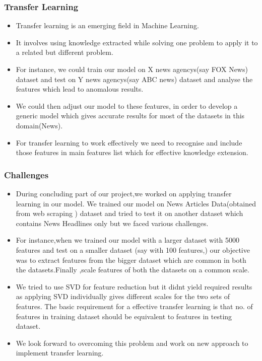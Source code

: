 \documentclass{beamer}
\newcommand\tab[1][1cm]{\hspace*{#1}}
\begin{document}
\begin{frame}
\frametitle{\tab \tab \tab \tab \huge Transfer Learning}
\begin{itemize}
\item Transfer learning is an emerging field in Machine Learning.
\item It involves using knowledge extracted while solving one problem to apply it to a related but different problem.
\item For instance, we could train our model on X news agency\textquotesingle s(say FOX News) dataset and test on Y news agency\textquotesingle s(say ABC news) dataset and analyse the features which lead to anomalous results.
\item We could then adjust our model to these features, in order to develop a generic model which gives accurate results for most of the datasets in this domain(News).
\item For transfer learning to work effectively we need to recognise and include those features in main features list which for effective knowledge extension.
\end{itemize}
\end {frame}

\begin{frame}
\frametitle{\tab \tab \tab \quad \quad \quad \huge Challenges}
\begin{itemize}
\item During concluding part of our project,we worked on applying transfer learning in our model. We trained our model on News Articles Data(obtained from web scraping ) dataset and tried to test it on another dataset which contains News Headlines only but we faced various challenges. \\
\item For instance,when we trained our model with a larger dataset with 5000 features and test on a smaller dataset (say with 100 features,) our objective was to extract features from the bigger dataset which are common in both the datasets.Finally ,scale features of both the datasets on a common scale. \\
\item We tried to use SVD for feature reduction but it didn\textquotesingle t yield required results as applying SVD individually gives different scales for the two sets of
features. The basic requirement for a effective transfer learning is that no. of
features in training dataset should be equivalent to features in testing dataset.\\
\item We look forward to overcoming this problem and work on new approach to implement transfer learning.
\end{itemize}
\end {frame}
\end{document}
